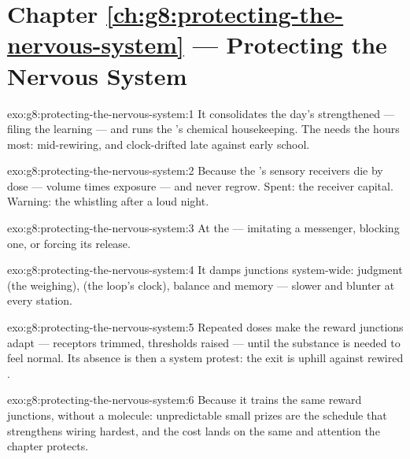 \section*{Chapter \ref{ch:g8:protecting-the-nervous-system} --- Protecting the Nervous System}

\begin{solution}{exo:g8:protecting-the-nervous-system:1}
It consolidates the day's strengthened  ---
filing the learning --- and runs the 's chemical
housekeeping. The   needs the hours most:
mid-rewiring, and clock-drifted late against early
school.
\end{solution}

\begin{solution}{exo:g8:protecting-the-nervous-system:2}
Because the 's sensory receivers die by dose ---
volume times exposure --- and never regrow. Spent: the
receiver capital. Warning: the whistling after a loud
night.
\end{solution}

\begin{solution}{exo:g8:protecting-the-nervous-system:3}
At the  --- imitating a messenger, blocking one,
or forcing its release.
\end{solution}

\begin{solution}{exo:g8:protecting-the-nervous-system:4}
It damps junctions system-wide: judgment (the weighing),
 (the loop's clock), balance and memory ---
slower and blunter at every station.
\end{solution}

\begin{solution}{exo:g8:protecting-the-nervous-system:5}
Repeated doses make the reward junctions adapt ---
receptors trimmed, thresholds raised --- until the
substance is needed to feel normal. Its absence is then a
system protest: the exit is uphill against rewired
.
\end{solution}

\begin{solution}{exo:g8:protecting-the-nervous-system:6}
Because it trains the same reward junctions, without a
molecule: unpredictable small prizes are the schedule
that strengthens wiring hardest, and the cost lands on
the same  and attention the chapter protects.
\end{solution}

